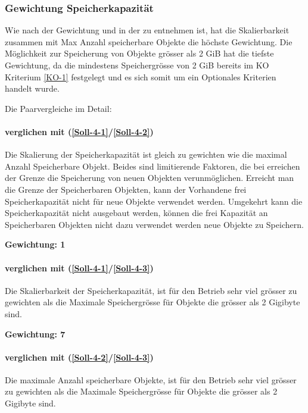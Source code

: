 \subsubsection*{Gewichtung Speicherkapazität}


Wie nach der Gewichtung und in der  zu entnehmen ist, hat die Skalierbarkeit zusammen mit Max Anzahl speicherbare Objekte die höchste Gewichtung. Die Möglichkeit zur Speicherung von Objekte grösser als 2 GiB hat die tiefste Gewichtung, da die mindestens Speichergrösse von 2 GiB bereits im KO Kriterium \ref{KO-1} festgelegt und es sich somit um ein Optionales Kriterien handelt wurde.

Die Paarvergleiche im Detail:

\paragraph*{ verglichen mit  (\ref{Soll-4-1}/\ref{Soll-4-2})}
Die Skalierung der Speicherkapazität ist gleich zu gewichten wie die maximal Anzahl Speicherbare Objekt. Beides sind limitierende Faktoren, die bei erreichen der Grenze die Speicherung von neuen Objekten verunmöglichen. Erreicht man die Grenze der Speicherbaren Objekten, kann der Vorhandene frei Speicherkapazität nicht für neue Objekte verwendet werden. Umgekehrt kann die Speicherkapazität nicht ausgebaut werden, können die frei Kapazität an Speicherbaren Objekten nicht dazu verwendet werden neue Objekte zu Speichern.

\textbf{Gewichtung: 1}

\paragraph*{ verglichen mit  (\ref{Soll-4-1}/\ref{Soll-4-3})}
Die Skalierbarkeit der Speicherkapazität, ist für den Betrieb sehr viel grösser zu gewichten als die Maximale Speichergrösse für Objekte die grösser als 2 Gigibyte sind.

\textbf{Gewichtung: 7}

\paragraph*{ verglichen mit  (\ref{Soll-4-2}/\ref{Soll-4-3})}
Die maximale Anzahl speicherbare Objekte, ist für den Betrieb sehr viel grösser zu gewichten als die Maximale Speichergrösse für Objekte die grösser als 2 Gigibyte sind.

